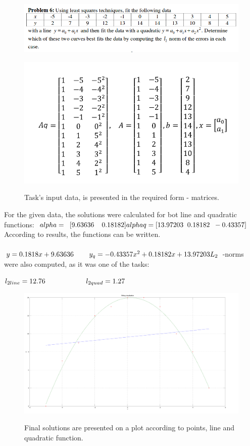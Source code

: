 \documentclass[eng,openany]{mgr}
\begin{document}
\begin{figure}[h]
\centering
\includegraphics[width=0.7\linewidth]{screenshot017}
\label{fig:screenshot017}
\end{figure}

\begin{figure}[h]
\centering
\includegraphics[width=0.4\linewidth]{screenshot018}
\label{fig:screenshot018}
\caption{Task's input data, is presented in the required form - matrices.}
\end{figure}

For the given data, the solutions were calculated for bot line and quadratic functions:
\begin{math}
alpha = \;\;[9.63636 \;\;\;\;0.18182]\\
alphaq = [13.97203 \;\;0.18182 \;\;-0.43357]\\\\
\end{math}
According to results, the functions can be written.\\\\
\begin{math}
y = 0.1818 x + 9.63636 \;\;\;\;\;\;\;\;y_q = -0.43357x^2 + 0.18182x + 13.97203\\\\
L_2
\end{math}
-norms were also computed, as it was one of the tasks:

\begin{math}
l_{2line} = 12.76 \;\;\;\;\;\;\;\;\;\;\;\;\;\;\;\;\;\;\;\;\;l_{2quad} =  1.27\\
\end{math}
\begin{figure}[h]
\centering
\includegraphics[width=0.9\linewidth]{screenshot020}
\label{fig:screenshot020}
\caption{Final solutions are presented on a plot according to points, line and quadratic function.}
\end{figure}
\end{document}
